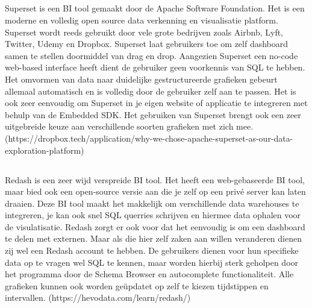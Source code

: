 \subsection{}%
\label{sec:superset}
Superset is een BI tool gemaakt door de Apache Software Foundation. Het is een moderne en volledig open source data verkenning en visualisatie platform. Superset wordt reeds gebruikt door vele grote bedrijven zoals Airbnb, Lyft, Twitter, Udemy en Dropbox. Superset laat gebruikers toe om zelf dashboard samen te stellen doormiddel van drag en drop. Aangezien Superset een no-code web-based interface heeft dient de gebruiker geen voorkennis van SQL te hebben. Het omvormen van data naar duidelijke gestructureerde grafieken gebeurt allemaal automatisch en is volledig door de gebruiker zelf aan te passen. Het is ook zeer eenvoudig om Superset in je eigen website of applicatie te integreren met behulp van de Embedded SDK. Het gebruiken van Superset brengt ook een zeer uitgebreide keuze aan verschillende soorten grafieken met zich  mee.
(https://dropbox.tech/application/why-we-chose-apache-superset-as-our-data-exploration-platform)

\subsection{}%
\label{sec:redash}
Redash is een zeer wijd verspreide BI tool. Het heeft een web-gebaseerde BI tool, maar bied ook een open-source versie aan die je zelf op een privé server kan laten draaien. Deze BI tool maakt het makkelijk om verschillende data warehouses te integreren, je kan ook snel SQL querries schrijven en hiermee data ophalen voor de visulatisatie. Redash zorgt er ook voor dat het eenvoudig is om een dashboard te delen met externen. Maar als die hier zelf zaken aan willen veranderen dienen zij wel een Redash account te hebben. De gebruikers dienen voor hun specifieke data op te vragen wel SQL te kennen, maar worden hierbij sterk geholpen door het programma door de Schema Browser en autocomplete functionaliteit. Alle grafieken kunnen ook worden geüpdatet op zelf te kiezen tijdstippen en intervallen.
(https://hevodata.com/learn/redash/) 

